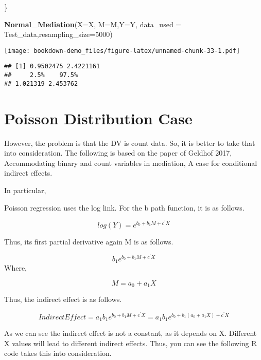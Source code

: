 \documentclass[]{book}
\newenvironment{Shaded}{\begin{snugshade}}{\end{snugshade}}
\newcommand{\DataTypeTok}[1]{\textcolor[rgb]{0.13,0.29,0.53}{#1}}
\newcommand{\DecValTok}[1]{\textcolor[rgb]{0.00,0.00,0.81}{#1}}
\newcommand{\KeywordTok}[1]{\textcolor[rgb]{0.13,0.29,0.53}{\textbf{#1}}}
\newcommand{\NormalTok}[1]{#1}
\begin{document}
\begin{Shaded}
\begin{Highlighting}[]
\NormalTok{\}}

\KeywordTok{Normal_Mediation}\NormalTok{(}\DataTypeTok{X=}\NormalTok{X, }\DataTypeTok{M=}\NormalTok{M,}\DataTypeTok{Y=}\NormalTok{Y, }\DataTypeTok{data_used =}\NormalTok{ Test_data,}\DataTypeTok{resampling_size=}\DecValTok{5000}\NormalTok{)}
\end{Highlighting}
\end{Shaded}

\texttt{[image: bookdown-demo\_files/figure-latex/unnamed-chunk-33-1.pdf]}

\begin{verbatim}
## [1] 0.9502475 2.4221161
##     2.5%    97.5% 
## 1.021319 2.453762
\end{verbatim}

\hypertarget{poisson-distribution-case}{%
\section{Poisson Distribution Case}\label{poisson-distribution-case}}

However, the problem is that the DV is count data. So, it is better to take that into consideration. The following is based on the paper of Geldhof 2017, Accommodating binary and count variables in mediation, A case for conditional indirect effects.

In particular,

Poisson regression uses the log link. For the b path function, it is as follows.

\[log(Y)=e^{b_0+b_1M+c^{'}X}\]

Thus, its first partial derivative again M is as follows.

\[b_1e^{b_0+b_1M+c^{'}X}\]
Where,

\[M=a_0+a_1X\]

Thus, the indirect effect is as follows.

\[IndirectEffect = a_1b_1e^{b_0+b_1M+c^{'}X}=a_1b_1e^{b_0+b_1(a_0+a_1X)+c^{'}X}\]

As we can see the indirect effect is not a constant, as it depends on X. Different X values will lead to different indirect effects. Thus, you can see the following R code takes this into consideration.
\end{document}
